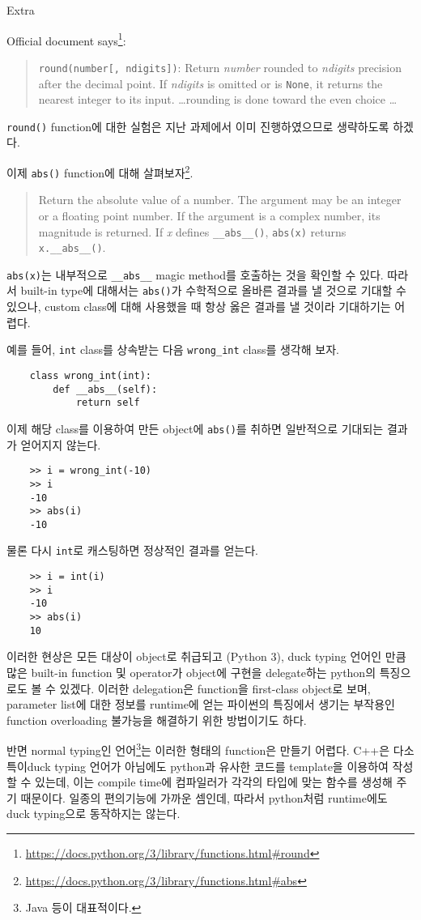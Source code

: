 \documentclass[a4paper,11pt]{scrartcl}
\begin{document}
\begin{labeling}{Extra}
  \item[Extra]
  Official document says\footnote{\url{https://docs.python.org/3/library/functions.html\#round}}:
  \begin{quotation}
    \lstinline{round(number[, ndigits])}: Return \emph{number} rounded to \emph{ndigits} precision after the decimal point. If \emph{ndigits} is omitted or is \lstinline{None}, it returns the nearest integer to its input. \dots rounding is done toward the even choice \dots
  \end{quotation}
  \lstinline{round()} function에 대한 실험은 지난 과제에서 이미 진행하였으므로 생략하도록 하겠다. \par
  이제 \lstinline{abs()} function에 대해 살펴보자\footnote{\url{https://docs.python.org/3/library/functions.html\#abs}}.
  \begin{quotation}
    Return the absolute value of a number. The argument may be an integer or a floating point number. If the argument is a complex number, its magnitude is returned. If \emph{x} defines \lstinline{__abs__()}, \lstinline{abs(x)} returns \lstinline{x.__abs__()}.
  \end{quotation}
  \lstinline{abs(x)}는 내부적으로 \lstinline{__abs__} magic method를 호출하는 것을 확인할 수 있다. 따라서 built-in type에 대해서는 \lstinline{abs()}가 수학적으로 올바른 결과를 낼 것으로 기대할 수 있으나, custom class에 대해 사용했을 때 항상 옳은 결과를 낼 것이라 기대하기는 어렵다. \par
  예를 들어, \lstinline{int} class를 상속받는 다음 \lstinline{wrong_int} class를 생각해 보자.
  \begin{lstlisting}
    class wrong_int(int):
        def __abs__(self):
            return self
  \end{lstlisting}
  이제 해당 class를 이용하여 만든 object에 \lstinline{abs()}를 취하면 일반적으로 기대되는 결과가 얻어지지 않는다.
  \begin{lstlisting}
    >> i = wrong_int(-10)
    >> i
    -10
    >> abs(i)
    -10
  \end{lstlisting}
  물론 다시 \lstinline{int}로 캐스팅하면 정상적인 결과를 얻는다.
  \begin{lstlisting}
    >> i = int(i)
    >> i
    -10
    >> abs(i)
    10
  \end{lstlisting}
  이러한 현상은 모든 대상이 object로 취급되고 (Python 3), duck typing 언어인 만큼 많은 built-in function 및 operator가 object에 구현을 delegate하는 python의 특징으로도 볼 수 있겠다. 이러한 delegation은 function을 first-class object로 보며, parameter list에 대한 정보를 runtime에 얻는 파이썬의 특징에서 생기는 부작용인 function overloading 불가능을 해결하기 위한 방법이기도 하다. \par
  반면 normal typing인 언어\footnote{Java 등이 대표적이다.}는 이러한 형태의 function은 만들기 어렵다. C++은 다소 특이 duck typing 언어가 아님에도 python과 유사한 코드를 template을 이용하여 작성할 수 있는데, 이는 compile time에 컴파일러가 각각의 타입에 맞는 함수를 생성해 주기 때문이다. 일종의 편의기능에 가까운 셈인데, 따라서 python처럼 runtime에도 duck typing으로 동작하지는 않는다.
\end{labeling}
\end{document}
